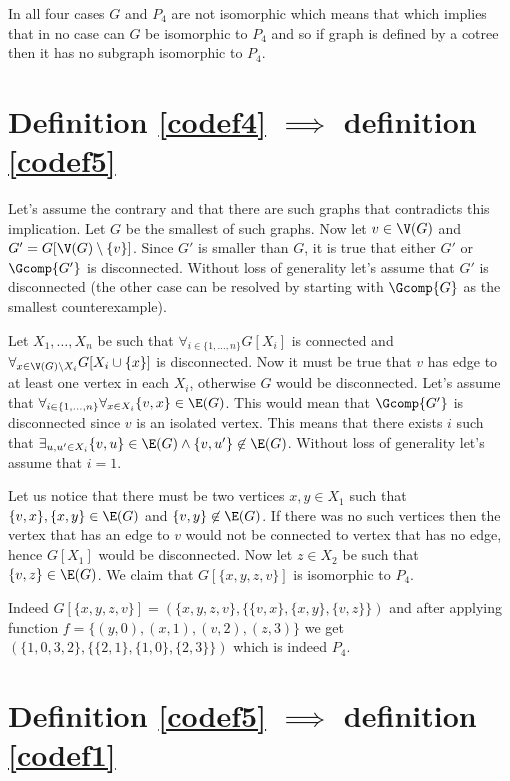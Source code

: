 In all four cases $G$ and $P_4$ are not isomorphic which means that which implies that in no case can $G$ be isomorphic to $P_4$ and so if graph is defined by a cotree then it has no subgraph isomorphic to $P_4$.

\section{Definition \ref{codef4} $\implies$ definition \ref{codef5}}

Let's assume the contrary and that there are such graphs that contradicts this implication. Let $G$ be the smallest of such graphs. Now let $v \in \V(G)$ and $G' = G[\V(G) \setminus \{v\}]$. Since $G'$ is smaller than $G$, it is true that either $G'$ or $\Gcomp{G'}$ is disconnected. Without loss of generality let's assume that $G'$ is disconnected (the other case can be resolved by starting with $\Gcomp{G}$ as the smallest counterexample).

Let $X_1, \ldots, X_n$ be such that $\forall_{i \in \{1, \ldots, n\}} G[X_i]$ is connected and $\forall_{x \in \V(G) \setminus X_i} G[X_i \cup \{x\}]$ is disconnected. Now it must be true that $v$ has edge to at least one vertex in each $X_i$, otherwise $G$ would be disconnected. Let's assume that $\forall_{i \in \{1,\ldots,n\}} \forall_{x \in X_i} \{v,x\} \in \E(G)$. This would mean that $\Gcomp{G'}$ is disconnected since $v$ is an isolated vertex. This means that there exists $i$ such that $\exists_{u, u' \in X_i} \{v, u\} \in \E(G) \land \{v, u'\} \not\in \E(G)$. Without loss of generality let's assume that $i = 1$.

Let us notice that there must be two vertices $x, y \in X_1$ such that $\{v, x\}, \{x, y\} \in \E(G)$ and $\{v,y\} \not\in \E(G)$. If there was no such vertices then the vertex that has an edge to $v$ would not be connected to vertex that has no edge, hence $G[X_1]$ would be disconnected. Now let $z \in X_2$ be such that $\{v, z\} \in \E(G)$. We claim that $G[\{x,y,z,v\}]$ is isomorphic to $P_4$.

Indeed $G[\{x,y,z,v\}] = (\{x,y,z,v\}, \{\{v,x\}, \{x, y\}, \{v,z\}\})$ and after applying function $f = \{(y, 0), (x, 1), (v, 2), (z, 3)\}$ we get $(\{1,0,3,2\}, \{\{2,1\}, \{1, 0\}, \{2,3\}\})$ which is indeed $P_4$.

\section{Definition \ref{codef5} $\implies$ definition \ref{codef1}}

